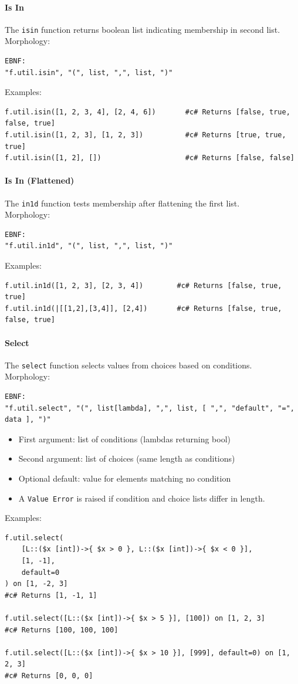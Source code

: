 \paragraph{Is In}
The \texttt{isin} function returns boolean list indicating membership in second list.\\
Morphology:
\begin{verbatim}
EBNF:
"f.util.isin", "(", list, ",", list, ")"
\end{verbatim}
Examples:
\begin{verbatim}
f.util.isin([1, 2, 3, 4], [2, 4, 6])       #c# Returns [false, true, false, true]
f.util.isin([1, 2, 3], [1, 2, 3])          #c# Returns [true, true, true]
f.util.isin([1, 2], [])                    #c# Returns [false, false]
\end{verbatim}

\paragraph{Is In (Flattened)}
The \texttt{in1d} function tests membership after flattening the first list.\\
Morphology:
\begin{verbatim}
EBNF:
"f.util.in1d", "(", list, ",", list, ")"
\end{verbatim}
Examples:
\begin{verbatim}
f.util.in1d([1, 2, 3], [2, 3, 4])        #c# Returns [false, true, true]
f.util.in1d(|[[1,2],[3,4]], [2,4])       #c# Returns [false, true, false, true]
\end{verbatim}

\paragraph{Select}
The \texttt{select} function selects values from choices based on conditions.\\
Morphology:
\begin{verbatim}
EBNF:
"f.util.select", "(", list[lambda], ",", list, [ ",", "default", "=", data ], ")"
\end{verbatim}
\begin{itemize}
\item First argument: list of conditions (lambdas returning bool)
\item Second argument: list of choices (same length as conditions)
\item Optional default: value for elements matching no condition
\item A \texttt{Value Error} is raised if condition and choice lists differ in length.
\end{itemize}
Examples:
\begin{verbatim}
f.util.select(
    [L::($x [int])->{ $x > 0 }, L::($x [int])->{ $x < 0 }],
    [1, -1],
    default=0
) on [1, -2, 3]
#c# Returns [1, -1, 1]

f.util.select([L::($x [int])->{ $x > 5 }], [100]) on [1, 2, 3]
#c# Returns [100, 100, 100]

f.util.select([L::($x [int])->{ $x > 10 }], [999], default=0) on [1, 2, 3]
#c# Returns [0, 0, 0]
\end{verbatim}

